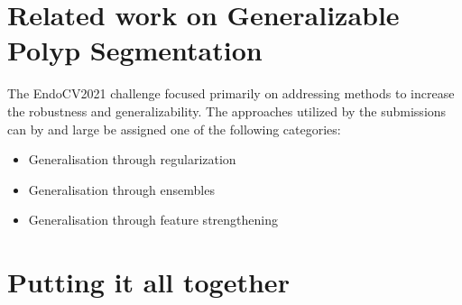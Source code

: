 \section{Related work on Generalizable Polyp Segmentation}
	The EndoCV2021 challenge focused primarily on addressing methods to increase the robustness and generalizability. The approaches utilized by the submissions can by and large be assigned one of the following categories:
	\begin{itemize}
		\item Generalisation through regularization
		\item Generalisation through ensembles
		\item Generalisation through feature strengthening 
	\end{itemize}
		
	\section{Putting it all together}